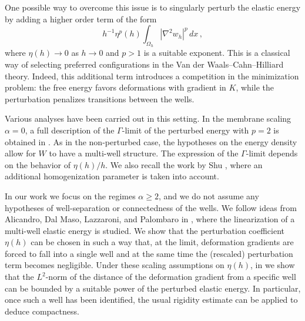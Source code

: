 \documentclass{article}
\theoremstyle{plain}
\theoremstyle{plain}
\theoremstyle{plain}
\theoremstyle{plain}
\theoremstyle{plain}
\theoremstyle{definition}
\theoremstyle{definition}
\begin{document}
One possible way to overcome this issue is to singularly perturb the elastic energy by adding a higher order term of the form
\[
	h^{-1}\eta^p(h) \int_{\Omega_h} |\nabla^2 w_h|^p \, dx\,,
\]
where $\eta(h) \to 0$ as $h \to 0$ and $p > 1$ is a suitable exponent. This is a classical way of selecting preferred configurations in the Van der Waals--Cahn--Hilliard theory. Indeed, this additional term introduces a competition in the minimization problem: the free energy favors deformations with gradient in $ K $, while the perturbation penalizes transitions between the wells.

Various analyses have been carried out in this setting. In the membrane scaling $\alpha = 0$, a full description of the $\Gamma$-limit of the perturbed energy with $p = 2$ is obtained in \cite{FONSECA2006, DALMASO2010}.
As in the non-perturbed case, the hypotheses on the energy density allow for $W$ to have a multi-well structure. The expression of the $ \Gamma $-limit depends on the behavior of $ \eta(h) / h $. We also recall the work by Shu \cite{SHU2000}, where an additional homogenization parameter is taken into account.

In our work we focus on the regimes $\alpha \geq 2$, and we do not assume any hypotheses of well-separation or connectedness of the wells.
We follow ideas from Alicandro, Dal Maso, Lazzaroni, and Palombaro in \cite{ALICANDRO2018}, where the linearization of a multi-well elastic energy is studied.
We show that the perturbation coefficient $ \eta(h) $ can be chosen in such a way that, at the limit, deformation gradients are forced to fall into a single well and at the same time the (rescaled) perturbation term becomes negligible.
Under these scaling assumptions on $ \eta(h) $, in  we show that the $L^2$-norm of the distance of the deformation gradient from a specific well can be bounded by a suitable power of the perturbed elastic energy.
In particular, once such a well has been identified, the usual rigidity estimate can be applied to deduce compactness.
\end{document}
